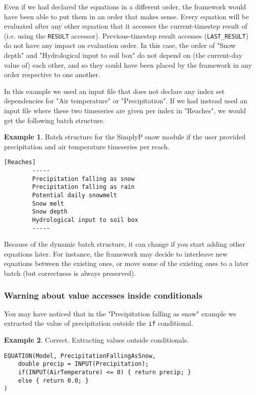 \documentclass[11pt]{article}
\theoremstyle{definition}
\newtheorem{myexample}{Example}
\newenvironment{example}%
  {\begin{lrbox}{\examplebox}%
   \begin{minipage}{\dimexpr\linewidth-2\fboxsep}
   \begin{myexample}}%
  {\end{myexample}%
   \end{minipage}%
   \end{lrbox}%
   \begin{trivlist}
     \item[]\colorbox{silver}{\usebox\examplebox}
   \end{trivlist}}
\begin{document}
Even if we had declared the equations in a different order, the framework would have been able to put them in an order that makes sense. Every equation will be evaluated after any other equation that it accesses the current-timestep result of (i.e. using the {\tt RESULT} accessor). Previous-timestep result accesses ({\tt LAST\_RESULT}) do not have any impact on evaluation order. In this case, the order of "Snow depth" and "Hydrological input to soil box" do not depend on (the current-day value of) each other, and so they could have been placed by the framework in any order respective to one another.

In this example we used an input file that does not declare any index set dependencies for "Air temperature" or "Precipitation". If we had instead used an input file where these two timeseries are given per index in "Reaches", we would get the following batch structure.

\begin{example}
Batch structure for the SimplyP snow module if the user provided precipitation and air temperature timeseries per reach.
\begin{lstlisting}[style=textstyle]
[Reaches]
        -----
        Precipitation falling as snow
        Precipitation falling as rain
        Potential daily snowmelt
        Snow melt
        Snow depth
        Hydrological input to soil box
        -----
\end{lstlisting}
\end{example}

Because of the dynamic batch structure, it can change if you start adding other equations later. For instance, the framework may decide to interleave new equations between the existing ones, or move some of the existing ones to a later batch (but correctness is always preserved).

\subsubsection{Warning about value accesses inside conditionals}

You may have noticed that in the "Precipitation falling as snow" example we extracted the value of precipitation outside the {\tt if} conditional.

\begin{example}\label{ex:simplypequations}
Correct. Extracting values outside conditionals.
\begin{lstlisting}[style=mycpp]
EQUATION(Model, PrecipitationFallingAsSnow,
	double precip = INPUT(Precipitation);
	if(INPUT(AirTemperature) <= 0) { return precip; }
	else { return 0.0; }
)
\end{lstlisting}
\end{example}
\end{document}
